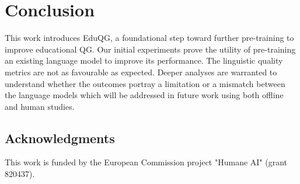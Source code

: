 \documentclass[letterpaper]{article} %
\begin{document}
\section{Conclusion}
This work introduces EduQG, a foundational step toward further pre-training to improve educational QG. Our initial experiments prove the utility of pre-training an existing language model to improve its performance. The linguistic quality metrics are not as favourable as expected. Deeper analyses are warranted to understand whether the outcomes portray a limitation or a mismatch between the language models which will be addressed in future work using both offline and human studies.

\subsection{Acknowledgments}
This work is funded by the European Commission project "Humane AI" (grant 820437).
\end{document}
